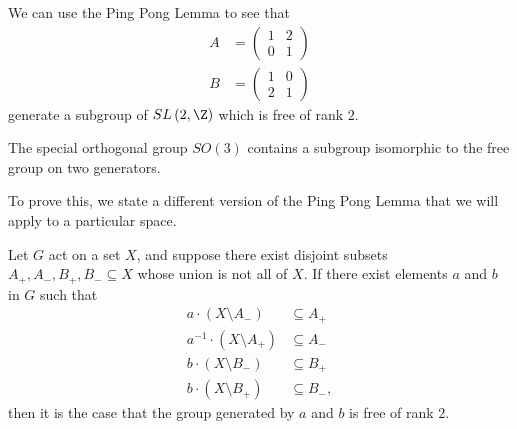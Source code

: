 \documentclass[10pt]{mypackage}
\begin{document}
\begin{example}
  We can use the Ping Pong Lemma to see that
  \begin{align*}
    A &= \begin{pmatrix}1 & 2 \\ 0 & 1\end{pmatrix}\\
    B &= \begin{pmatrix}1 & 0 \\ 2 & 1\end{pmatrix}
  \end{align*}
  generate a subgroup of $SL\left(2,\Z\right)$ which is free of rank $2$.
\end{example}
\begin{corollary}
  The special orthogonal group $SO(3)$ contains a subgroup isomorphic to the free group on two generators.
\end{corollary}
To prove this, we state a different version of the Ping Pong Lemma that we will apply to a particular space.
\begin{theorem}
  Let $G$ act on a set $X$, and suppose there exist disjoint subsets $A_{+},A_{-},B_{+},B_{-}\subseteq X$ whose union is not all of $X$. If there exist elements $a$ and $b$ in $G$ such that
  \begin{align*}
    a\cdot \left(X\setminus A_{-}\right) &\subseteq A_{+}\\
    a^{-1}\cdot \left(X\setminus A_{+}\right) &\subseteq A_{-}\\
    b \cdot \left(X\setminus B_{-}\right) &\subseteq B_{+}\\
    b\cdot \left(X\setminus B_{+}\right) &\subseteq B_{-},
  \end{align*}
  then it is the case that the group generated by $a$ and $b$ is free of rank $2$.
\end{theorem}
\end{document}
